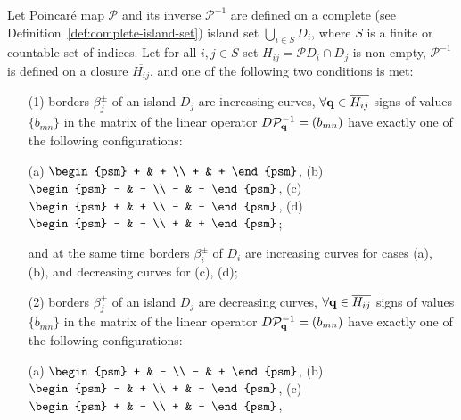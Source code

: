 \begin{theorem}
	Let Poincar\'e map $\mathcal{P}$ and its inverse $\mathcal{P}^{-1}$ are defined on a complete (see Definition~\ref{def:complete-island-set}) island set $\bigcup_{i \in S} D_i$, where $S$ is a finite or countable set of indices.
	Let for all $i, j \in S$ set $H_{ij} = \mathcal{P} D_i \cap D_j$ is non-empty, $\mathcal{P}^{-1}$ is defined on a
	 closure $\overline{H_{ij}}$, and one of the following two conditions is met:
	\begin{enumerate}
		\item[(1)] borders $\beta_j^{\pm}$ of an island $D_j$ are increasing curves, $\forall \vb{q} \in \overline{H_{ij}}$ signs of values $\{ b_{mn} \}$ in the matrix of the linear operator $D \mathcal{P}_{\vb{q}}^{-1} = (b_{mn})$ have exactly one of the following configurations:
			\begin{center}
				(a) $\begin{psm} + & + \\ + & + \end{psm}$, \quad
				(b) $\begin{psm} - & - \\ - & - \end{psm}$, \quad
				(c) $\begin{psm} + & + \\ - & - \end{psm}$, \quad
				(d) $\begin{psm} - & - \\ + & + \end{psm}$;
			\end{center}
			and at the same time borders $\beta_i^{\pm}$ of $D_i$ are increasing curves for cases (a), (b), and decreasing curves for (c), (d);
		\item[(2)] borders $\beta_j^{\pm}$ of an island $D_j$ are decreasing curves, $\forall \vb{q} \in \overline{H_{ij}}$ signs of values $\{ b_{mn} \}$ in the matrix of the linear operator $D \mathcal{P}_{\vb{q}}^{-1} = (b_{mn})$ have exactly one of the following configurations:
			\begin{center}
				(a) $\begin{psm} + & - \\ - & + \end{psm}$, \quad
				(b) $\begin{psm} - & + \\ + & - \end{psm}$,	\quad
				(c) $\begin{psm} + & - \\ + & - \end{psm}$, \quad

\end{center}
\end{enumerate}
\end{theorem}
